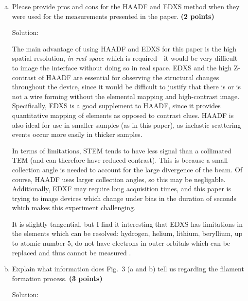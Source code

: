 \begin{homeworkProblem}
\begin{enumerate}[a)]
\begin{callout}{Solution:}
            Second, EDXS also can only be done (effectively) with STEM, since the signal is integrated over the area which electrons "illuminate" the sample. For a collimated TEM the signature is indecipherable because the illuminated area is typically the entire sample. For a STEM though, it is possible to determine elemental signatures with high spatial resolution, as the beam is focused to a small point.

            \end{callout}
        \item Please provide pros and cons for the HAADF and EDXS method when they were used for the measurements presented in the paper. \textbf{(2 points)}
            \begin{callout}{Solution:}

                The main advantage of using HAADF and EDXS for this paper is the high spatial resolution, \textit{in real space} which is required - it would be very difficult to image the interface without doing so in real space. EDXS and the high Z-contrast of HAADF are essential for observing the structural changes throughout the device, since it would be difficult to justify that there is or is not a wire forming without the elemental mapping and high-contrast image. Specifically, EDXS is a good supplement to HAADF, since it provides quantitative mapping of elements as opposed to contrast clues. HAADF is also ideal for use  in smaller samples (as in this paper), as inelastic scattering events occur more easily in thicker samples.

                In terms of limitations, STEM tends to have less signal than a collimated TEM (and can therefore have reduced contrast). This is because a small collection angle is needed to account for the large divergence of the beam. Of course, HAADF uses larger collection angles, so this may be negligable. Additionally, EDXF may require long acquisition times, and this paper is trying to image devices which change under bias in the duration of seconds which makes this experiment challenging.

                It is slightly tangential, but I find it interesting that EDXS has limitations in the elements which can be resolved: hydrogen, helium, lithium, beryllium, up to atomic number 5, do not have electrons in outer orbitals which can be replaced and thus cannot be measured \cite{enwiki:1320764489}. 
            \end{callout}
        \item Explain what information does Fig.\ 3 (a and b) tell us regarding the filament formation process. \textbf{(3 points)}
            \begin{callout}{Solution:}


\end{callout}
\end{enumerate}
\end{homeworkProblem}
